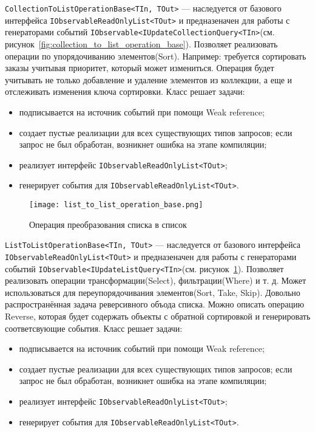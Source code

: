 \lstinline[style=csharpinlinestyle]!CollectionToListOperationBase<TIn, TOut>! --- наследуется от базового интерфейса \lstinline[style=csharpinlinestyle]!IObservableReadOnlyList<TOut>!
и предназеначен для работы с генераторами событий \lstinline[style=csharpinlinestyle]!IObservable<IUpdateCollectionQuery<TIn>!(см. рисунок~\ref{fig:collection_to_list_operation_base}).
Позволяет реализовать операции по упорядочиванию элементов(Sort). Например: требуется сортировать заказы учитывая приоритет, который может измениться.
Операция будет учитывать не только добавление и удаление элементов из коллекции, а еще и отслеживать изменения ключа сортировки.
Класс решает задачи:

\begin{itemize}
  \item подписывается на источник событий при помощи Weak reference;
  \item создает пустые реализации для всех существующих типов запросов; если запрос не был обработан, возникнет ошибка на этапе компиляции;
  \item реализует интерфейс \lstinline[style=csharpinlinestyle]!IObservableReadOnlyList<TOut>!;
  \item генерирует события для \lstinline[style=csharpinlinestyle]!IObservableReadOnlyList<TOut>!.
\end{itemize}

\begin{figure}[ht]
\centering
  \texttt{[image: list\_to\_list\_operation\_base.png]}
  \caption{ Операция преобразования списка в список }
  \label{fig:list_to_list_operation_base}
\end{figure}

\lstinline[style=csharpinlinestyle]!ListToListOperationBase<TIn, TOut>! --- наследуется от базового интерфейса \lstinline[style=csharpinlinestyle]!IObservableReadOnlyList<TOut>!
и предназеначен для работы с генераторами событий \lstinline[style=csharpinlinestyle]!IObservable<IUpdateListQuery<TIn>!(см. рисунок~\ref{fig:list_to_list_operation_base}).
Позволяет реализовать операции трансформации(Select), фильтрации(Where) и т. д. Может использоваться для переупорядочивания элементов(Sort, Take, Skip).
Довольно распространённая задача реверсивного объода списка. Можно описать операцию Reverse, которая будет содержать объекты с обратной сортировкой и генерировать соответсвующие события.
Класс решает задачи:

\begin{itemize}
  \item подписывается на источник событий при помощи Weak reference;
  \item создает пустые реализации для всех существующих типов запросов; если запрос не был обработан, возникнет ошибка на этапе компиляции;
  \item реализует интерфейс \lstinline[style=csharpinlinestyle]!IObservableReadOnlyList<TOut>!;
  \item генерирует события для \lstinline[style=csharpinlinestyle]!IObservableReadOnlyList<TOut>!.
\end{itemize}

